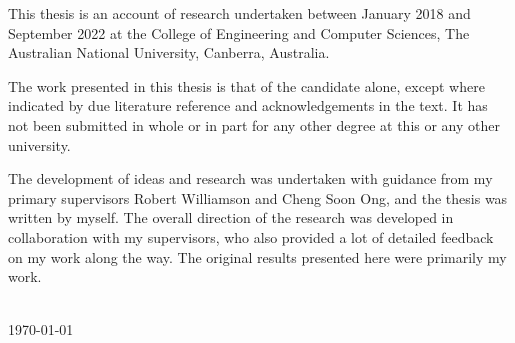\begin{declaration}
\begingroup
\large
\noindent This thesis is an account of research undertaken between January 2018 and September 2022 at the College of Engineering and Computer Sciences, The Australian National University, Canberra, Australia. 


The work presented in this thesis is that of the candidate alone, except where indicated by due literature reference and acknowledgements in the text. It has not been submitted in whole or in part for any other degree at this or any other university.

The development of ideas and research was undertaken with guidance from my primary supervisors Robert Williamson and Cheng Soon Ong, and the thesis was written by myself. The overall direction of the research was developed in collaboration with my supervisors, who also provided a lot of detailed feedback on my work along the way. The original results presented here were primarily my work.

\bigskip
\vspace{1cm}
\begin{flushright}
\authorname\\
\today
\end{flushright}
\endgroup
\end{declaration}
\vspace{3cm}
\cleardoublepage


